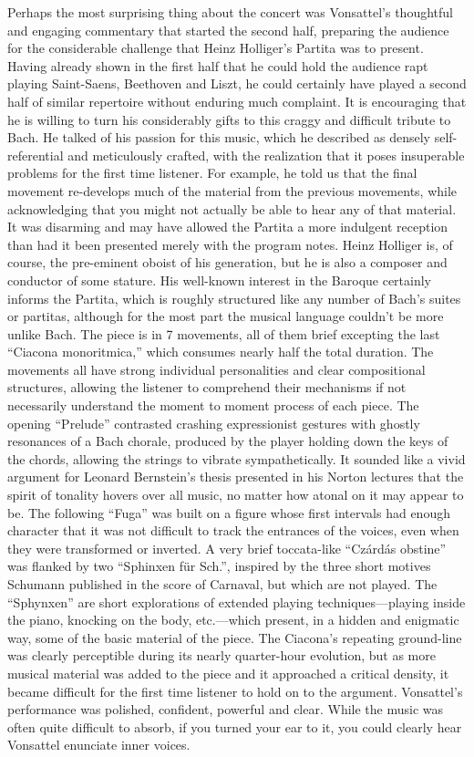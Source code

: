 Perhaps the most surprising thing about the concert was Vonsattel’s thoughtful and engaging commentary that started the second half, preparing the audience for the considerable challenge that Heinz Holliger’s Partita was to present. Having already shown in the first half that he could hold the audience rapt playing Saint-Saens, Beethoven and Liszt, he could certainly have played a second half of similar repertoire without enduring much complaint. It is encouraging that he is willing to turn his considerably gifts to this craggy and difficult tribute to Bach. He talked of his passion for this music, which he described as densely self-referential and meticulously crafted, with the realization that it poses insuperable problems for the first time listener. For example, he told us that the final movement re-develops much of the material from the previous movements, while acknowledging that you might not actually be able to hear any of that material. It was disarming and may have allowed the Partita a more indulgent reception than had it been presented merely with the program notes. Heinz Holliger is, of course, the pre-eminent oboist of his generation, but he is also a composer and conductor of some stature. His well-known interest in the Baroque certainly informs the Partita, which is roughly structured like any number of Bach’s suites or partitas, although for the most part the musical language couldn’t be more unlike Bach. The piece is in 7 movements, all of them brief excepting the last “Ciacona monoritmica,” which consumes nearly half the total duration. The movements all have strong individual personalities and clear compositional structures, allowing the listener to comprehend their mechanisms if not necessarily understand the moment to moment process of each piece. The opening “Prelude” contrasted crashing expressionist gestures with ghostly resonances of a Bach chorale, produced by the player holding down the keys of the chords, allowing the strings to vibrate sympathetically. It sounded like a vivid argument for Leonard Bernstein’s thesis presented in his Norton lectures that the spirit of tonality hovers over all music, no matter how atonal on it may appear to be. The following “Fuga” was built on a figure whose first intervals had enough character that it was not difficult to track the entrances of the voices, even when they were transformed or inverted. A very brief toccata-like “Czárdás obstine” was flanked by two “Sphinxen für Sch.”, inspired by the three short motives Schumann published in the score of Carnaval, but which are not played. The “Sphynxen” are short explorations of extended playing techniques—playing inside the piano, knocking on the body, etc.—which present, in a hidden and enigmatic way, some of the basic material of the piece. The Ciacona’s repeating ground-line was clearly perceptible during its nearly quarter-hour evolution, but as more musical material was added to the piece and it approached a critical density, it became difficult for the first time listener to hold on to the argument. Vonsattel’s performance was polished, confident, powerful and clear. While the music was often quite difficult to absorb, if you turned your ear to it, you could clearly hear Vonsattel enunciate inner voices.

